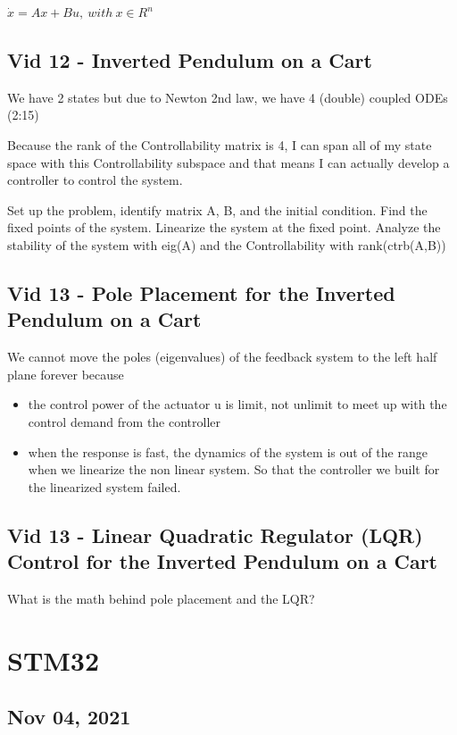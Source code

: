 \documentclass{article}
\begin{document}
$\dot{x} = Ax + Bu, ~with~ x\in R^n$ \\

\subsection{Vid 12 - Inverted Pendulum on a Cart}
We have 2 states but due to Newton 2nd law, we have 4 (double) coupled ODEs (2:15)


Because the rank of the Controllability matrix is 4,
I can span all of my state space with this Controllability subspace and that means
I can actually develop a controller to control the system.


Set up the problem, identify matrix A, B, and the initial condition.
Find the fixed points of the system.
Linearize the system at the fixed point.
Analyze the stability of the system with eig(A) and the Controllability with rank(ctrb(A,B))

\subsection{Vid 13 - Pole Placement for the Inverted Pendulum on a Cart}
We cannot move the poles (eigenvalues) of the feedback system to the left half plane forever
because
\begin{itemize}
	\item 	the control power of the actuator u is limit, 
			not unlimit to meet up with the control demand from the controller
	\item 	when the response is fast, the dynamics of the system is out of the range
			when we linearize the non linear system. So that the controller we built
			for the linearized system failed.			
\end{itemize}

\subsection{Vid 13 - Linear Quadratic Regulator (LQR) Control for the Inverted Pendulum on a Cart}

What is the math behind pole placement and the LQR?

\section{STM32}

\subsection{Nov 04, 2021}
\end{document}
